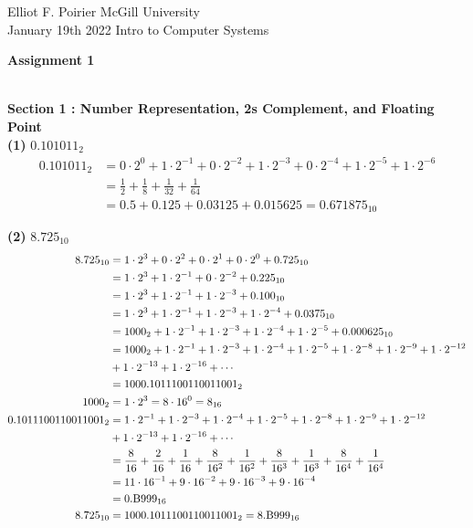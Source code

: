 \documentclass[11pt]{article}
\begin{document}
\noindent Elliot F. Poirier
\hfill
McGill University
\\
January 19th 2022
\hfill
Intro to Computer Systems
\\
\begin{center}
\textbf{\Large{Assignment 1}}
\end{center}
\hfill
\\

\noindent \textbf{\large{Section 1 : Number Representation, 2s Complement, and Floating Point}}
\\

\noindent \textbf{(1) } $0.101011_2$
\begin{equation}
    \begin{split}
        0.101011_2 &= 0 \cdot 2^0 + 1 \cdot 2^{-1} + 0 \cdot 2^{-2} + 1 \cdot 2^{-3} + 0 \cdot 2^{-4} + 1 \cdot 2^{-5} + 1 \cdot 2^{-6}\\
        &= \frac{1}{2} + \frac{1}{8} + \frac{1}{32} + \frac{1}{64}\\
        &= 0.5 + 0.125 + 0.03125 + 0.015625 = 0.671875_{10}
    \end{split}
\end{equation}

\noindent \textbf{(2) } $8.725_{10}$
\begin{equation}
    \begin{split}
        \space 8.725_{10} &= 1 \cdot 2^3 + 0 \cdot 2^2 + 0 \cdot 2^1 + 0 \cdot 2^0 + 0.725_{10}\\
        & = 1 \cdot 2^3 + 1 \cdot 2^{-1} + 0 \cdot 2^{-2} + 0.225_{10}\\
        &= 1 \cdot 2^3 + 1 \cdot 2^{-1} + 1 \cdot 2^{-3} + 0.100_{10}\\
        &= 1 \cdot 2^3 + 1 \cdot 2^{-1}  + 1 \cdot 2^{-3} + 1 \cdot 2^{-4} + 0.0375_{10}\\
        & = 1000_2 + 1 \cdot 2^{-1} + 1 \cdot 2^{-3} + 1 \cdot 2^{-4} + 1 \cdot 2^{-5} + 0.000625_{10}\\
        &= 1000_2 + 1 \cdot 2^{-1} + 1 \cdot 2^{-3} + 1 \cdot 2^{-4} + 1 \cdot 2^{-5} + 1 \cdot 2^{-8} + 1 \cdot 2^{-9} + 1 \cdot 2^{-12}\\
        & + 1 \cdot 2^{-13} + 1 \cdot 2^{-16} + \cdots \\
        &= 1000.1011100110011001_2\\
        1000_2 &= 1 \cdot 2^3 = 8 \cdot 16^0 = 8_{16}\\
        0.1011100110011001_2 &= 1 \cdot 2^{-1} + 1 \cdot 2^{-3} + 1 \cdot 2^{-4} + 1 \cdot 2^{-5} + 1 \cdot 2^{-8} + 1 \cdot 2^{-9} + 1 \cdot 2^{-12}\\
        & + 1 \cdot 2^{-13} + 1 \cdot 2^{-16} + \cdots \\
        &= \frac{8}{16} + \frac{2}{16} + \frac{1}{16} + \frac{8}{16^2} + \frac{1}{16^2} + \frac{8}{16^3} + \frac{1}{16^3} + \frac{8}{16^4} + \frac{1}{16^4}\\
        &= 11 \cdot 16^{-1} + 9 \cdot 16^{-2} + 9 \cdot 16^{-3} + 9 \cdot 16^{-4}\\
        &= \text{0.B999}_{16}\\
        8.725_{10} &= 1000.1011100110011001_2 = \text{8.B999}_{16}
    \end{split}
\end{equation}
\end{document}
